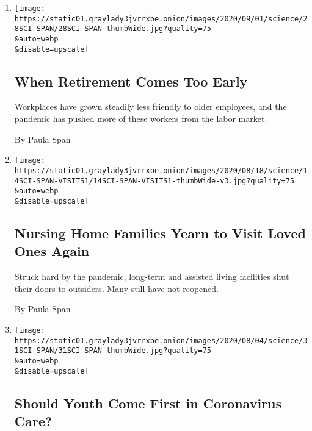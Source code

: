 \begin{enumerate}
\def\labelenumi{\arabic{enumi}.}
\item
  \href{/2020/08/28/health/coronavirus-retirement-recession.html}{}

  \texttt{[image: https://static01.graylady3jvrrxbe.onion/images/2020/09/01/science/28SCI-SPAN/28SCI-SPAN-thumbWide.jpg?quality=75\\\&auto=webp\\\&disable=upscale]}

  \hypertarget{when-retirement-comes-too-early}{%
  \subsection{When Retirement Comes Too
  Early}\label{when-retirement-comes-too-early}}

  Workplaces have grown steadily less friendly to older employees, and
  the pandemic has pushed more of these workers from the labor market.

  By Paula Span
\item
  \href{/2020/08/14/health/coronavirus-elder-care.html}{}

  \texttt{[image: https://static01.graylady3jvrrxbe.onion/images/2020/08/18/science/14SCI-SPAN-VISITS1/14SCI-SPAN-VISITS1-thumbWide-v3.jpg?quality=75\\\&auto=webp\\\&disable=upscale]}

  \hypertarget{nursing-home-families-yearn-to-visit-loved-ones-again}{%
  \subsection{Nursing Home Families Yearn to Visit Loved Ones
  Again}\label{nursing-home-families-yearn-to-visit-loved-ones-again}}

  Struck hard by the pandemic, long-term and assisted living facilities
  shut their doors to outsiders. Many still have not reopened.

  By Paula Span
\item
  \href{/2020/07/31/health/coronavirus-ethics-rationing-elderly.html}{}

  \texttt{[image: https://static01.graylady3jvrrxbe.onion/images/2020/08/04/science/31SCI-SPAN/31SCI-SPAN-thumbWide.jpg?quality=75\\\&auto=webp\\\&disable=upscale]}

  \hypertarget{should-youth-come-first-in-coronavirus-care}{%
  \subsection{Should Youth Come First in Coronavirus
  Care?}\label{should-youth-come-first-in-coronavirus-care}}


\end{enumerate}
